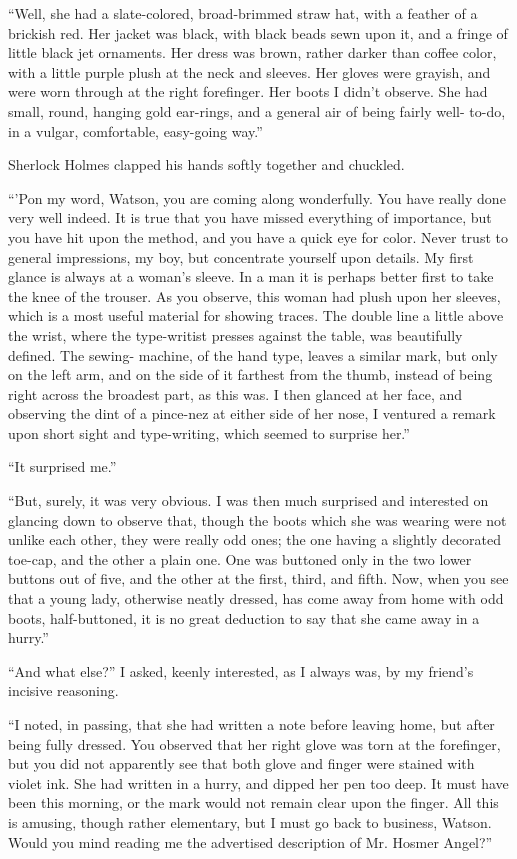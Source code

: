 “Well, she had a slate-colored, broad-brimmed straw hat,
with a feather of a brickish red. Her jacket was black, with
black beads sewn upon it, and a fringe of little black jet
ornaments. Her dress was brown, rather darker than coffee color,
with a little purple plush at the neck and sleeves. Her
gloves were grayish, and were worn through at the right
forefinger. Her boots I didn’t observe. She had small, round,
hanging gold ear-rings, and a general air of being fairly well-%
to-do, in a vulgar, comfortable, easy-going way.”

Sherlock Holmes clapped his hands softly together and
chuckled.

“’Pon my word, Watson, you are coming along wonderfully.
You have really done very well indeed. It is true that you
have missed everything of importance, but you have hit upon
the method, and you have a quick eye for color. Never trust
to general impressions, my boy, but concentrate yourself upon
details. My first glance is always at a woman’s sleeve. In a
man it is perhaps better first to take the knee of the trouser.
As you observe, this woman had plush upon her sleeves,
which is a most useful material for showing traces. The
double line a little above the wrist, where the type-writist
presses against the table, was beautifully defined. The sewing-%
machine, of the hand type, leaves a similar mark, but only
on the left arm, and on the side of it farthest from the thumb,
instead of being right across the broadest part, as this was.
I then glanced at her face, and observing the dint of a pince-nez
at either side of her nose, I ventured a remark upon short
sight and type-writing, which seemed to surprise her.”

“It surprised me.”

“But, surely, it was very obvious. I was then much surprised
and interested on glancing down to observe that,
though the boots which she was wearing were not unlike each
other, they were really odd ones; the one having a slightly
decorated toe-cap, and the other a plain one. One was buttoned
only in the two lower buttons out of five, and the other
at the first, third, and fifth. Now, when you see that a young
lady, otherwise neatly dressed, has come away from home
with odd boots, half-buttoned, it is no great deduction to say
that she came away in a hurry.”

“And what else?” I asked, keenly interested, as I always
was, by my friend’s incisive reasoning.

“I noted, in passing, that she had written a note before
leaving home, but after being fully dressed. You observed
that her right glove was torn at the forefinger, but you did not
apparently see that both glove and finger were stained with
violet ink. She had written in a hurry, and dipped her pen
too deep. It must have been this morning, or the mark would
not remain clear upon the finger. All this is amusing, though
rather elementary, but I must go back to business, Watson.
Would you mind reading me the advertised description of Mr.
Hosmer Angel?”

